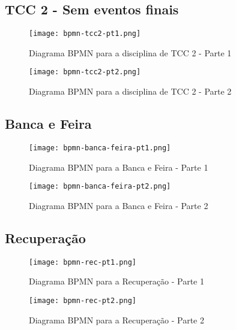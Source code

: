 \subsection{TCC 2 - Sem eventos finais}
\begin{figure}[H]
    \centering
    \texttt{[image: bpmn-tcc2-pt1.png]}
    \caption{Diagrama BPMN para a disciplina de TCC 2 - Parte 1}
    \label{fig:bpmn-tcc2-pt1}
\end{figure}

\begin{figure}[H]
    \centering
    \texttt{[image: bpmn-tcc2-pt2.png]}
    \caption{Diagrama BPMN para a disciplina de TCC 2 - Parte 2}
    \label{fig:bpmn-tcc2-pt2}
\end{figure}

\subsection{Banca e Feira}
\begin{figure}[H]
    \centering
    \texttt{[image: bpmn-banca-feira-pt1.png]}
    \caption{Diagrama BPMN para a Banca e Feira - Parte 1}
    \label{fig:bpmn-banca-feira-pt1}
\end{figure}

\begin{figure}[H]
    \centering
    \texttt{[image: bpmn-banca-feira-pt2.png]}
    \caption{Diagrama BPMN para a Banca e Feira - Parte 2}
    \label{fig:bpmn-banca-feira-pt2}
\end{figure}

\subsection{Recuperação}
\begin{figure}[H]
    \centering
    \texttt{[image: bpmn-rec-pt1.png]}
    \caption{Diagrama BPMN para a Recuperação - Parte 1}
    \label{fig:bpmn-rec-pt1}
\end{figure}

\begin{figure}[H]
    \centering
    \texttt{[image: bpmn-rec-pt2.png]}
    \caption{Diagrama BPMN para a Recuperação - Parte 2}
    \label{fig:bpmn-rec-pt2}
\end{figure}
